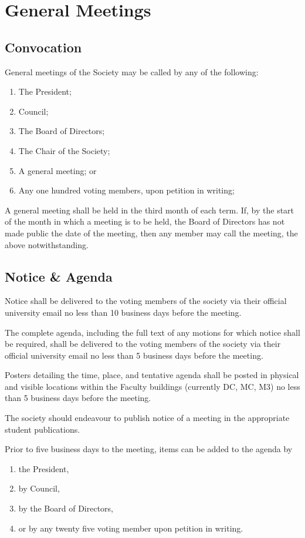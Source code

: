 \section{General Meetings}
\subsection{Convocation}
General meetings of the Society may be called by any of the following:
\begin{enumerate}
  \item The President;
  \item Council;
  \item The Board of Directors;
  \item The Chair of the Society;
  \item A general meeting; or
  \item Any one hundred voting members, upon petition in writing;
\end{enumerate}

A general meeting shall be held in the third month of each term. If, by the
start of the month in which a meeting is to be held, the Board of Directors has
not made public the date of the meeting, then any member may call the meeting,
the above notwithstanding.

\subsection{Notice \& Agenda}

Notice shall be delivered to the voting members of the society via their official university email no less than 10 business days before the meeting.

The complete agenda, including the full text of any motions for which notice shall be required, shall be delivered to the voting members of the society via their official university email no less than 5 business days before the meeting.

Posters detailing the time, place, and tentative agenda shall be posted in physical and visible locations within the Faculty buildings (currently DC, MC, M3) no less than 5 business days before the meeting.

The society should endeavour to publish notice of a meeting in the appropriate student publications.

Prior to five business days to the meeting, items can be added to the agenda by
\begin{enumerate}
    \item the President, 
    \item by Council, 
    \item by the Board of Directors, 
    \item or by any twenty five voting member upon petition in writing.
\end{enumerate}

